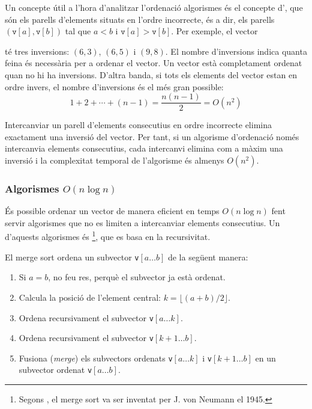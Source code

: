 Un concepte útil a l'hora d'analitzar l'ordenació
algorismes és el concepte d', que són
els parells d'elements situats en l'ordre incorrecte, és
a dir, els parells
$(\texttt{v}[a],\texttt{v}[b])$ tal que
$a<b$ i $\texttt{v}[a]>\texttt{v}[b]$.
Per exemple, el vector
\begin{center}
\end{center}
té tres inversions: $(6,3)$, $(6,5)$ i $(9,8)$.
El nombre d'inversions indica
quanta feina és necessària per a ordenar el vector.
Un vector està completament ordenat quan
no hi ha inversions.
D'altra banda, si tots els elements del vector
estan en ordre invers,
el nombre d'inversions és el més gran possible:
\[1+2+\cdots+(n-1)=\frac{n(n-1)}{2} = O(n^2)\]

Intercanviar un parell d'elements consecutius en
ordre incorrecte elimina exactament una inversió
del vector.
Per tant, si un algorisme d'ordenació només
intercanvia elements consecutius, cada intercanvi elimina
com a màxim una inversió i la complexitat temporal
de l'algorisme és almenys $O(n^2)$.

\subsubsection{Algorismes $O(n \log n)$}


És possible ordenar un vector de manera eficient
en temps $O(n \log n)$ fent servir algorismes
que no es limiten a intercanviar elements consecutius.
Un d'aquests algorismes és \footnote{Segons \cite{knu983},
el merge sort va ser inventat per J. von Neumann el 1945.},
que es basa en la recursivitat.

El merge sort ordena un subvector \texttt{v}$[a \ldots b]$ de la següent manera:

\begin{enumerate}
\item Si $a=b$, no feu res, perquè el subvector ja està ordenat.
\item Calcula la posició de l'element central: $k=\lfloor (a+b)/2 \rfloor$.
\item Ordena recursivament el subvector \texttt{v}$[a \ldots k]$.
\item Ordena recursivament el subvector \texttt{v}$[k+1 \ldots b]$.
\item Fusiona (\emph{merge}) els subvectors ordenats \texttt{v}$[a \ldots k]$ i
\texttt{v}$[k+1 \ldots b]$
en un subvector ordenat \texttt{v}$[a \ldots b]$.
\end{enumerate}

